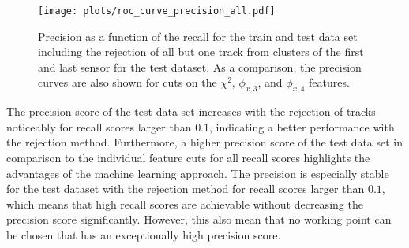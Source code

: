 
\begin{figure}[H]
  \centering
  \texttt{[image: plots/roc\_curve\_precision\_all.pdf]}
  \caption{Precision as a function of the recall for the train and test data set including the rejection of all but one track from clusters of the first and last
           sensor for the test dataset. As a comparison, the precision curves are also shown for cuts on the $\chi^2$, $\phi_{x,3}$, and $\phi_{x,4}$ features.}
  \label{fig:precision}
\end{figure}
The precision score of the test data set increases with the rejection of tracks noticeably for recall scores larger than $0.1$, indicating a better performance with the rejection method.
Furthermore, a higher precision score of the test data set in comparison to the individual feature cuts for all recall scores highlights the advantages of the machine
learning approach. The precision is especially stable for the test dataset with the rejection method for recall scores larger than $0.1$, which means that high recall scores
are achievable without decreasing the precision score significantly. However, this also mean that no working point can be chosen that has an exceptionally high precision score.

